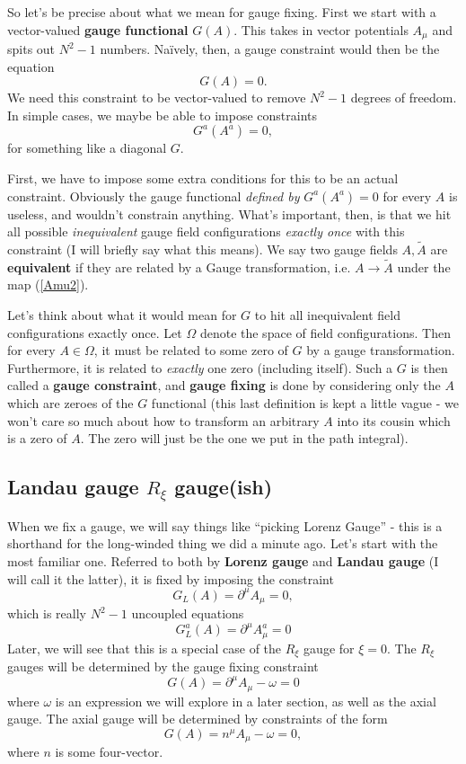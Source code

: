 \documentclass[main.tex]{subfiles}
\begin{document}
So let's be precise about what we mean for gauge fixing. First we start with a vector-valued \textbf{gauge functional} $G(A)$. This takes in vector potentials $A_\mu$ and spits out $N^2 -1$ numbers. Na\"ively, then, a gauge constraint would then be the equation
\label{gaugeconstraint}
\begin{equation}
G(A) = 0.
\end{equation}
We need this constraint to be vector-valued to remove $N^2 -1$ degrees of freedom. In simple cases, we maybe be able to impose constraints 
\[
G^a (A^a) = 0,
\]
for something like a diagonal $G$.

First, we have to impose some extra conditions for this to be an actual constraint. Obviously the gauge functional \textit{defined by} $G^a(A^a) = 0$ for every $A$ is useless, and wouldn't constrain anything. What's important, then, is that we hit all possible \textit{inequivalent} gauge field configurations \textit{exactly once} with this constraint (I will briefly say what this means). We say two gauge fields $A,\tilde{A}$ are \textbf{equivalent} if they are related by a Gauge transformation, i.e. $A \to \tilde{A}$ under the map (\ref{Amu2}).

Let's think about what it would mean for $G$ to hit all inequivalent field configurations exactly once. Let $\Omega$ denote the space of field configurations. Then for every $A \in \Omega$, it must be related to some zero of $G$ by a gauge transformation. Furthermore, it is related to \textit{exactly} one zero (including itself). Such a $G$ is then called a \textbf{gauge constraint}, and \textbf{gauge fixing} is done by considering only the $A$ which are zeroes of the $G$ functional (this last definition is kept a little vague - we won't care so much about how to transform an arbitrary $A$ into its cousin which is a zero of $A$. The zero will just be the one we put in the path integral).

\subsection{Landau gauge $R_\xi$ gauge(ish)}
When we fix a gauge, we will say things like ``picking Lorenz Gauge'' - this is a shorthand for the long-winded thing we did a minute ago. Let's start with the most familiar one. Referred to both by \textbf{Lorenz gauge} and \textbf{Landau gauge} (I will call it the latter), it is fixed by imposing the constraint
\begin{equation}\label{l_gauge} %
G_L (A) = \partial^\mu A_\mu = 0,
\end{equation}
which is really $N^2 -1$ uncoupled equations
\[
G_L^a(A) = \partial^\mu A_\mu^a = 0
\]
Later, we will see that this is a special case of the $R_\xi$ gauge for $\xi = 0$. The $R_\xi$ gauges will be determined by the gauge fixing constraint
\[
G(A) = \partial^\mu A_\mu - \omega = 0
\]
where $\omega$ is an expression we will explore in a later section, as well as the axial gauge. The axial gauge will be determined by constraints of the form
\[
G(A) = n^\mu A_\mu - \omega = 0,
\]
where $n$ is some four-vector. 
\end{document}

